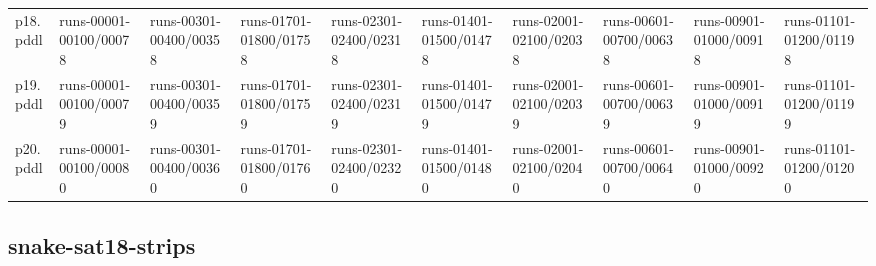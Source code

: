 \documentclass{article}
\begin{document}
\begin{tabular}{@{}lrrrrrrrrr@{}}
p18.pddl & \multicolumn{1}{|l|}{runs-00001-00100/00078} & \multicolumn{1}{|l|}{runs-00301-00400/00358} & \multicolumn{1}{|l|}{runs-01701-01800/01758} & \multicolumn{1}{|l|}{runs-02301-02400/02318} & \multicolumn{1}{|l|}{runs-01401-01500/01478} & \multicolumn{1}{|l|}{runs-02001-02100/02038} & \multicolumn{1}{|l|}{runs-00601-00700/00638} & \multicolumn{1}{|l|}{runs-00901-01000/00918} & \multicolumn{1}{|l|}{runs-01101-01200/01198} \\
p19.pddl & \multicolumn{1}{|l|}{runs-00001-00100/00079} & \multicolumn{1}{|l|}{runs-00301-00400/00359} & \multicolumn{1}{|l|}{runs-01701-01800/01759} & \multicolumn{1}{|l|}{runs-02301-02400/02319} & \multicolumn{1}{|l|}{runs-01401-01500/01479} & \multicolumn{1}{|l|}{runs-02001-02100/02039} & \multicolumn{1}{|l|}{runs-00601-00700/00639} & \multicolumn{1}{|l|}{runs-00901-01000/00919} & \multicolumn{1}{|l|}{runs-01101-01200/01199} \\
p20.pddl & \multicolumn{1}{|l|}{runs-00001-00100/00080} & \multicolumn{1}{|l|}{runs-00301-00400/00360} & \multicolumn{1}{|l|}{runs-01701-01800/01760} & \multicolumn{1}{|l|}{runs-02301-02400/02320} & \multicolumn{1}{|l|}{runs-01401-01500/01480} & \multicolumn{1}{|l|}{runs-02001-02100/02040} & \multicolumn{1}{|l|}{runs-00601-00700/00640} & \multicolumn{1}{|l|}{runs-00901-01000/00920} & \multicolumn{1}{|l|}{runs-01101-01200/01200} \\
\end{tabular}

\hypertarget{run_dir-snake-sat18-strips}{}
\subsection*{snake-sat18-strips}
\end{document}
